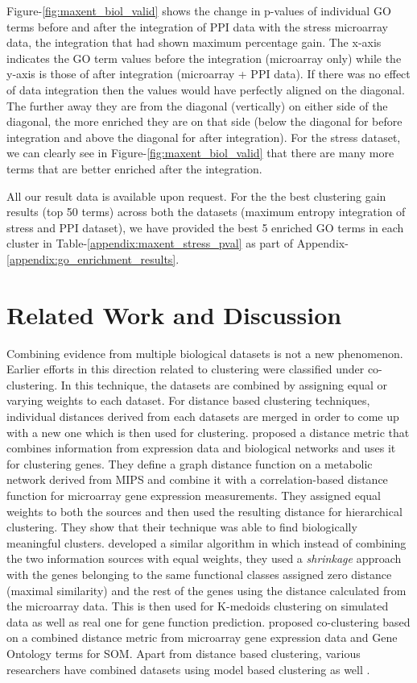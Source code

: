 Figure-\ref{fig:maxent_biol_valid} shows the change in p-values of individual GO terms before and after the integration of PPI data with the stress microarray data, the integration that had shown maximum percentage gain. The x-axis indicates the GO term values before the integration (microarray only) while the y-axis is those of after integration (microarray + PPI data). If there was no effect of data integration then the values would have perfectly aligned on the diagonal. The further away they are from the diagonal (vertically) on either side of the diagonal, the more enriched they are on that side (below the diagonal for before integration and above the diagonal for after integration). For the stress dataset, we can clearly see in Figure-\ref{fig:maxent_biol_valid} that there are many more terms that are better enriched after the integration. 

All our result data is available upon request. For the the best clustering gain results (top 50 terms) across both the datasets (maximum entropy integration of stress and PPI dataset), we have provided the best 5 enriched GO terms in each cluster in Table-\ref{appendix:maxent_stress_pval} as part of Appendix-\ref{appendix:go_enrichment_results}. 
\section{Related Work and Discussion}

Combining evidence from multiple biological datasets is not a new phenomenon. Earlier efforts in this direction related to clustering were classified under co-clustering. In this technique, the datasets are combined by assigning equal or varying weights to each dataset. For distance based clustering techniques, individual distances derived from each datasets are merged in order to come up with a new one which is then used for clustering. \citet{Hanisch2002Coclustering} proposed a distance metric that combines information from expression data and biological networks and uses it for clustering genes. They define a graph distance function on a metabolic network derived from MIPS \citep{Gueldener2006MPact} and combine it with a correlation-based distance function for microarray gene expression measurements. They assigned equal weights to both the sources and then used the resulting distance for hierarchical clustering. They show that their technique was able to find biologically meaningful clusters. \citet{huang2006incorporating} developed a similar algorithm in which instead of combining the two information sources with equal weights, they used a \textit{shrinkage} approach with the genes belonging to the same functional classes assigned zero distance (maximal similarity) and the rest of the genes using the distance calculated from the microarray data. This is then used for K-medoids clustering on simulated data as well as real one for gene function prediction. \citet{bramier2007coclustering} proposed co-clustering based on a combined distance metric from microarray gene expression data and Gene Ontology terms for \ac{SOM}. Apart from distance based clustering, various researchers have combined datasets using model based clustering as well \citep{pan06incorporating}.

